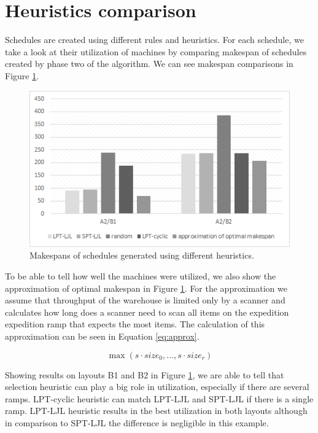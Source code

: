 \documentclass{ctuthesis}
\begin{document}
\section{Heuristics comparison}

Schedules are created using different rules and heuristics. For each schedule, we take a look at their utilization of machines by comparing makespan of schedules created by phase two of the algorithm. We can see makespan comparisons in Figure \ref{fig:c1}. 

\begin{figure}[H]
\includegraphics[width=\linewidth]{c1.png}
\caption{Makespans of schedules generated using different heuristics.}
\label{fig:c1}
\end{figure}

To be able to tell how well the machines were utilized, we also show the approximation of optimal makespan in Figure \ref{fig:c1}. For the approximation we assume that throughput of the warehouse is limited only by a scanner and calculates how long does a scanner need to scan all items on the expedition expedition ramp that expects the most items. The calculation of this approximation can be seen in Equation \ref{eq:approx}.

\begin{equation}
\label{eq:approx}
    \max(s \cdot size_0, \ldots, s \cdot size_r)
\end{equation}


Showing results on layouts B1 and B2 in Figure \ref{fig:c1}, we are able to tell that selection heuristic can play a big role in utilization, especially if there are several ramps. LPT-cyclic heuristic can match LPT-LJL and SPT-LJL if there is a single ramp. LPT-LJL heuristic results in the best utilization in both layouts although in comparison to SPT-LJL the difference is negligible in this example.
\end{document}

